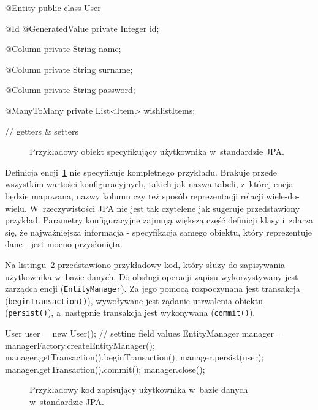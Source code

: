 \begin{verbbox}[\footnotesize]
@Entity
public class User {
    @Id
    @GeneratedValue
    private Integer id;

    @Column
    private String name;

    @Column
    private String surname;

    @Column 
    private String password;

    @ManyToMany
    private List<Item> wishlistItems;

    // getters & setters
}
\end{verbbox}

\begin{figure}[ht!]
	\centering
	\theverbbox
	\caption{Przykładowy obiekt specyfikujący użytkownika w~standardzie JPA.}
	\label{lst:sample_jpa_pojo}
\end{figure}

Definicja encji~\ref{lst:sample_jpa_pojo} nie specyfikuje kompletnego przykładu. Brakuje przede wszystkim wartości konfiguracyjnych, takich jak nazwa tabeli, z~której encja będzie mapowana, nazwy kolumn czy też sposób reprezentacji relacji wiele-do-wielu. W~rzeczywistości JPA nie jest tak czytelene jak sugeruje przedstawiony przykład. Parametry konfiguracyjne zajmują większą część definicji klasy i~zdarza się, że najważniejsza informacja - specyfikacja samego obiektu, który reprezentuje dane - jest mocno przysłonięta.

Na listingu~\ref{lst:sample_jpa_entity_manager} przedstawiono przykładowy kod, który służy do zapisywania użytkownika w~bazie danych. Do obsługi operacji zapisu wykorzystywany jest zarządca encji (\verb+EntityManager+). Za jego pomocą rozpoczynana jest transakcja (\verb+beginTransaction()+), wywoływane jest żądanie utrwalenia obiektu (\verb+persist()+), a~następnie transakcja jest wykonywana (\verb+commit()+).

\begin{verbbox}[\footnotesize]
User user = new User();
// setting field values
EntityManager manager = managerFactory.createEntityManager();
  manager.getTransaction().beginTransaction();
    manager.persist(user);
  manager.getTransaction().commit();
manager.close();
\end{verbbox}

\begin{figure}[ht!]
	\centering
	\theverbbox
	\caption{Przykładowy kod zapisujący użytkownika w~bazie danych w~standardzie JPA.}
	\label{lst:sample_jpa_entity_manager}
\end{figure}

